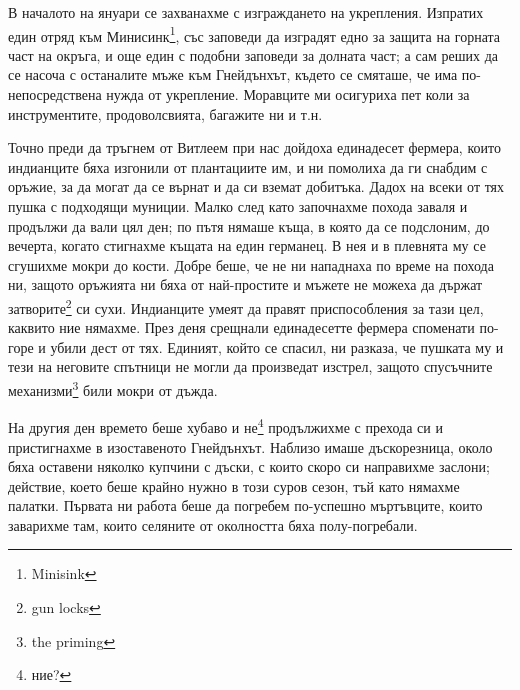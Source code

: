 \documentclass[12pt]{book}
\begin{document}
В началото на януари се захванахме с изграждането на укрепления. Изпратих един отряд към Минисинк\footnote{Minisink}, със заповеди да изградят едно за защита на горната част на окръга, и още един с подобни заповеди за долната част; а сам реших да се насоча с останалите мъже към Гнейдънхът, където се смяташе, че има по-непосредствена нужда от укрепление. Моравците ми осигуриха пет коли за инструментите, продоволсвията, багажите ни и т.н. 

Точно преди да тръгнем от Витлеем при нас дойдоха единадесет фермера, които индианците бяха изгонили от плантациите им, и ни помолиха да ги снабдим с оръжие, за да могат да се върнат и да си вземат добитъка. Дадох на всеки от тях пушка с подходящи муниции. Малко след като започнахме похода заваля и продължи да вали цял ден; по пътя нямаше къща, в която да се подслоним, до вечерта, когато стигнахме къщата на един германец. В нея и в плевнята му се сгушихме мокри до кости. Добре беше, че не ни нападнаха по време на похода ни, защото оръжията ни бяха от най-простите и мъжете не можеха да държат затворите\footnote{gun locks} си сухи. Индианците умеят да правят приспособления за тази цел, каквито ние нямахме. През деня срещнали единадесетте фермера споменати по-горе и убили дест от тях. Единият, който се спасил, ни разказа, че пушката му и тези на неговите спътници не могли да произведат изстрел, защото спусъчните механизми\footnote{the priming} били мокри от дъжда.

На другия ден времето беше хубаво и не\footnote{ние?} продължихме с прехода си и пристигнахме в изоставеното Гнейдънхът. Наблизо имаше дъскорезница, около бяха оставени няколко купчини с дъски, с които скоро си направихме заслони; действие, което беше крайно нужно в този суров сезон, тъй като нямахме палатки. Първата ни работа беше да погребем по-успешно мъртъвците, които заварихме там, които селяните от околността бяха полу-погребали. 
\end{document}
